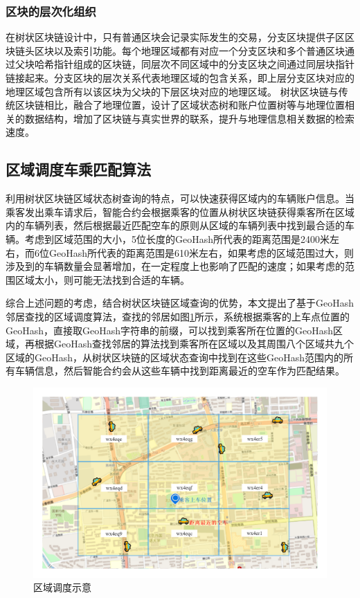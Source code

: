 \subsubsection{区块的层次化组织}
在树状区块链设计中，只有普通区块会记录实际发生的交易，分支区块提供子区区块链头区块以及索引功能。每个地理区域都有对应一个分支区块和多个普通区块通过父块哈希指针组成的区块链，同层次不同区域中的分支区块之间通过同层块指针链接起来。分支区块的层次关系代表地理区域的包含关系，即上层分支区块对应的地理区域包含所有以该区块为父块的下层区块对应的地理区域。
树状区块链与传统区块链相比，融合了地理位置，设计了区域状态树和账户位置树等与地理位置相关的数据结构，增加了区块链与真实世界的联系，提升与地理信息相关数据的检索速度。

\subsection{区域调度车乘匹配算法}

利用树状区块链区域状态树查询的特点，可以快速获得区域内的车辆账户信息。当乘客发出乘车请求后，智能合约会根据乘客的位置从树状区块链获得乘客所在区域内的车辆列表，然后根据最近匹配空车的原则从区域的车辆列表中找到最合适的车辆。考虑到区域范围的大小，5位长度的GeoHash所代表的距离范围是2400米左右，而6位GeoHash所代表的距离范围是610米左右，如果考虑的区域范围过大，则涉及到的车辆数量会显著增加，在一定程度上也影响了匹配的速度；如果考虑的范围区域太小，则可能无法找到合适的车辆。

综合上述问题的考虑，结合树状区块链区域查询的优势，本文提出了基于GeoHash邻居查找的区域调度算法，查找的邻居如图\ref{fig:regionManage}所示，系统根据乘客的上车点位置的GeoHash，直接取GeoHash字符串的前缀，可以找到乘客所在位置的GeoHash区域，再根据GeoHash查找邻居的算法找到乘客所在区域以及其周围八个区域共九个区域的GeoHash，从树状区块链的区域状态查询中找到在这些GeoHash范围内的所有车辆信息，然后智能合约会从这些车辆中找到距离最近的空车作为匹配结果。

\begin{figure}
  \centering
  \includegraphics[width=1.0\textwidth]{figures/区域调度}
  \caption{区域调度示意}\label{fig:regionManage}
\end{figure}

